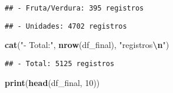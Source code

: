 \documentclass[,,,oneauthor,pdftex]{Definitions/mdpi}
\newenvironment{Shaded}{\begin{snugshade}}{\end{snugshade}}
\newcommand{\DecValTok}[1]{\textcolor[rgb]{0.00,0.00,0.81}{#1}}
\newcommand{\FunctionTok}[1]{\textcolor[rgb]{0.13,0.29,0.53}{\textbf{#1}}}
\newcommand{\NormalTok}[1]{#1}
\newcommand{\SpecialCharTok}[1]{\textcolor[rgb]{0.81,0.36,0.00}{\textbf{#1}}}
\newcommand{\StringTok}[1]{\textcolor[rgb]{0.31,0.60,0.02}{#1}}
\begin{document}
\begin{Shaded}
\end{Shaded}

\begin{verbatim}
## - Fruta/Verdura: 395 registros
\end{verbatim}

\begin{Shaded}
\end{Shaded}

\begin{verbatim}
## - Unidades: 4702 registros
\end{verbatim}

\begin{Shaded}
\begin{Highlighting}[]
\FunctionTok{cat}\NormalTok{(}\StringTok{"{-} Total:"}\NormalTok{, }\FunctionTok{nrow}\NormalTok{(df\_final), }\StringTok{"registros}\SpecialCharTok{\textbackslash{}n}\StringTok{"}\NormalTok{)}
\end{Highlighting}
\end{Shaded}

\begin{verbatim}
## - Total: 5125 registros
\end{verbatim}

\begin{Shaded}
\begin{Highlighting}[]
\FunctionTok{print}\NormalTok{(}\FunctionTok{head}\NormalTok{(df\_final, }\DecValTok{10}\NormalTok{))}
\end{Highlighting}
\end{Shaded}
\end{document}
